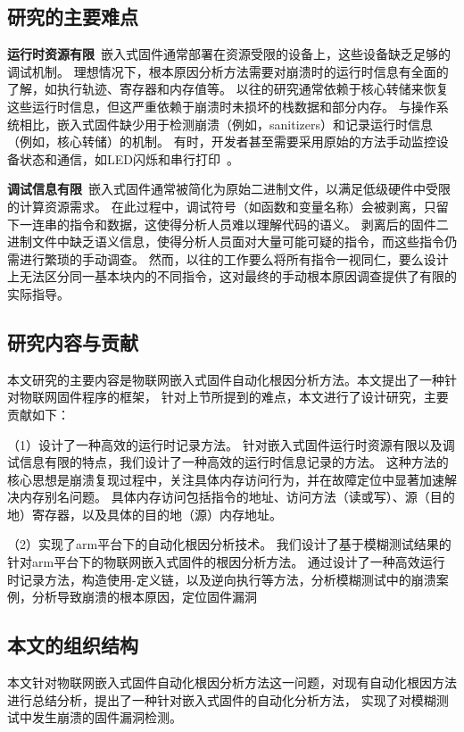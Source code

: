 \subsection{研究的主要难点}
\textbf{运行时资源有限}\ 嵌入式固件通常部署在资源受限的设备上，这些设备缺乏足够的调试机制。
理想情况下，根本原因分析方法需要对崩溃时的运行时信息有全面的了解，如执行轨迹、寄存器和内存值等。
以往的研究通常依赖于核心转储来恢复这些运行时信息，但这严重依赖于崩溃时未损坏的栈数据和部分内存。
与操作系统相比，嵌入式固件缺少用于检测崩溃（例如，sanitizers）和记录运行时信息（例如，核心转储）的机制。
有时，开发者甚至需要采用原始的方法手动监控设备状态和通信，如LED闪烁和串行打印~\cite{IoT2021}。

\textbf{调试信息有限}\ 嵌入式固件通常被简化为原始二进制文件，以满足低级硬件中受限的计算资源需求。
在此过程中，调试符号（如函数和变量名称）会被剥离，只留下一连串的指令和数据，这使得分析人员难以理解代码的语义。
剥离后的固件二进制文件中缺乏语义信息，使得分析人员面对大量可能可疑的指令，而这些指令仍需进行繁琐的手动调查。
然而，以往的工作要么将所有指令一视同仁，要么设计上无法区分同一基本块内的不同指令，这对最终的手动根本原因调查提供了有限的实际指导。

\subsection{研究内容与贡献}
本文研究的主要内容是物联网嵌入式固件自动化根因分析方法。本文提出了一种针对物联网固件程序的框架，
针对上节所提到的难点，本文进行了设计研究，主要贡献如下：

（1）设计了一种高效的运行时记录方法。
针对嵌入式固件运行时资源有限以及调试信息有限的特点，我们设计了一种高效的运行时信息记录的方法。
这种方法的核心思想是崩溃复现过程中，关注具体内存访问行为，并在故障定位中显著加速解决内存别名问题。
具体内存访问包括指令的地址、访问方法（读或写）、源（目的地）寄存器，以及具体的目的地（源）内存地址。

（2）实现了arm平台下的自动化根因分析技术。
我们设计了基于模糊测试结果的针对arm平台下的物联网嵌入式固件的根因分析方法。
通过设计了一种高效运行时记录方法，构造使用-定义链，以及逆向执行等方法，分析模糊测试中的崩溃案例，分析导致崩溃的根本原因，定位固件漏洞

\subsection{本文的组织结构}
本文针对物联网嵌入式固件自动化根因分析方法这一问题，对现有自动化根因方法进行总结分析，提出了一种针对嵌入式固件的自动化分析方法，
实现了对模糊测试中发生崩溃的固件漏洞检测。

